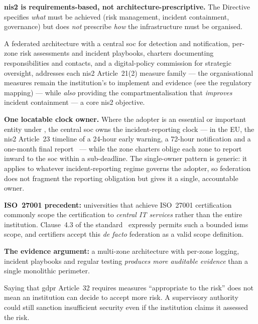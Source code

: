 \begin{answerbox}[Answer to Q8.1]
\textbf{\gls{nis2} is requirements-based, not architecture-prescriptive.} The Directive specifies \emph{what} must be achieved (risk management, incident containment, governance) but does \emph{not} prescribe \emph{how} the infrastructure must be organised.

\medskip\noindent A federated architecture with a central \gls{soc} for detection and notification, per-zone risk assessments and incident playbooks, charters documenting responsibilities and contacts, and a digital-policy commission for strategic oversight, addresses each \gls{nis2} Article~21(2) measure family --- the organisational measures remain the institution's to implement and evidence (see the regulatory mapping) --- while \emph{also} providing the compartmentalisation that \emph{improves} incident containment --- a core \gls{nis2} objective.

\medskip\noindent\textbf{One locatable clock owner.} Where the adopter is an essential or important entity under , the central \gls{soc} owns the incident-reporting clock --- in the EU, the \gls{nis2} Article~23 timeline of a 24-hour early warning, a 72-hour notification and a one-month final report~\cite{nis2} --- while the zone charters oblige each zone to report inward to the \gls{soc} within a sub-deadline. The single-owner pattern is generic: it applies to whatever incident-reporting regime governs the adopter, so federation does not fragment the reporting obligation but gives it a single, accountable owner.

\medskip\noindent\textbf{ISO~27001 precedent:} universities that achieve ISO~27001 certification commonly scope the certification to \emph{central IT services} rather than the entire institution. Clause~4.3 of the standard~\cite{iso27001} expressly permits such a bounded \gls{isms} scope, and certifiers accept this \emph{de facto} federation as a valid scope definition.

\medskip\noindent\textbf{The evidence argument:} a multi-zone architecture with per-zone logging, incident playbooks and regular testing \emph{produces more auditable evidence} than a single monolithic perimeter.
\end{answerbox}

\bigskip

\begin{questionbox}
Saying that \gls{gdpr} Article~32 requires measures ``appropriate to the risk'' does not mean an institution can decide to accept more risk. A supervisory authority could still sanction insufficient security even if the institution claims it assessed the risk.
\end{questionbox}

